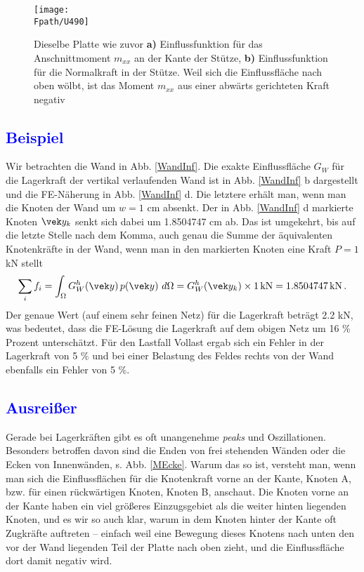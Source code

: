 {%
\begin{figure}[tbp]
\centering
\if {} \sidecaption \fi
\texttt{[image: \\Fpath/U490]}
\caption{Dieselbe Platte wie zuvor {\bf a)} Einflussfunktion f\"{u}r das Anschnittmoment $m_{xx}$ an der Kante der St\"{u}tze, {\bf b)} Einflussfunktion f\"{u}r die Normalkraft in der St\"{u}tze. Weil sich die Einflussfl\"{a}che nach oben w\"{o}lbt, ist das Moment $m_{xx}$ aus einer abw\"{a}rts gerichteten Kraft negativ } \label{U490}
\end{figure}%
{\textcolor{blue}{\subsection{Beispiel}}}
 Wir betrachten die Wand in Abb. \ref{WandInf}.
Die exakte Einflussfl\"{a}che $G_W$ f\"{u}r die Lagerkraft der vertikal verlaufenden Wand ist in Abb. \ref{WandInf} b dargestellt und die FE-N\"{a}herung in Abb. \ref{WandInf} d. Die letztere
erh\"{a}lt man, wenn man die Knoten der Wand um $w = 1 $ cm absenkt. Der in Abb. \ref{WandInf} d markierte Knoten $\vek y_k$ senkt sich dabei um 1.8504747 cm ab. Das ist
umgekehrt, bis auf die letzte Stelle nach dem Komma, auch genau die Summe der
\"{a}quivalenten Knotenkr\"{a}fte in der Wand, wenn man in den markierten Knoten eine Kraft $P =
1$ kN stellt
\begin{align}
\sum_i f_i = \int_{\Omega} G_W^h(\vek y) \,p(\vek y)\,\,d\Omega =
G_W^h(\vek y_k) \times 1 \,\mbox{kN} = 1.8504747\, \mbox{kN}\,.
\end{align}
Der genaue Wert (auf einem sehr feinen Netz) f\"{u}r die Lagerkraft betr\"{a}gt 2.2 kN, was
bedeutet, dass die FE-L\"{o}sung die Lagerkraft auf dem obigen Netz um 16 \% Prozent
untersch\"{a}tzt. F\"{u}r den Lastfall Vollast ergab sich ein Fehler in der Lagerkraft von 5 \%
und bei einer Belastung des Feldes rechts von der Wand ebenfalls ein Fehler von 5 \%.

{\textcolor{blue}{\subsection{Ausrei{\ss}er}}
Gerade bei Lagerkr\"{a}ften gibt es oft unangenehme {\em peaks\/} und
Oszillationen. Besonders betroffen davon sind die Enden von frei stehenden W\"{a}nden oder
die Ecken von Innenw\"{a}nden, s. Abb. \ref{MEcke}. Warum das so ist, versteht man, wenn man
sich die Einflussfl\"{a}chen f\"{u}r die Knotenkraft vorne an der Kante, Knoten A, bzw. f\"{u}r
einen r\"{u}ckw\"{a}rtigen Knoten, Knoten B, anschaut. Die Knoten vorne an der Kante haben ein
viel gr\"{o}{\ss}eres Einzugsgebiet als die weiter hinten liegenden Knoten, und es wir so auch
klar, warum in dem Knoten hinter der Kante oft Zugkr\"{a}fte auftreten -- einfach weil eine
Bewegung dieses Knotens nach unten den vor der Wand liegenden Teil der Platte nach oben
zieht, und die Einflussfl\"{a}che dort damit negativ wird.


}}
